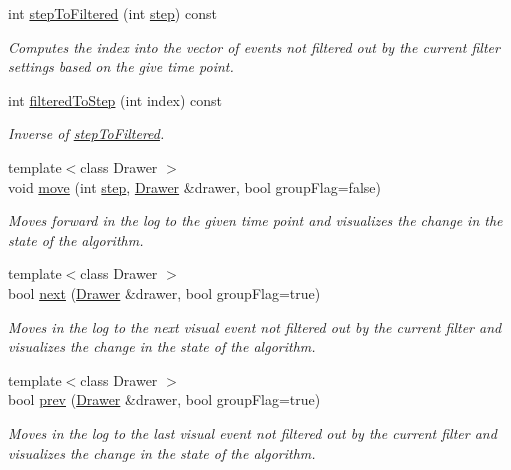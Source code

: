 \begin{DoxyCompactItemize}
int \hyperlink{structVisualLog_af2765ed0921d608071988ac0b0200b54}{step\+To\+Filtered} (int \hyperlink{structVisualLog_a7fb296e9d2f755787cd1a0e2e16a0e77}{step}) const 
\begin{DoxyCompactList}\small\item\em Computes the index into the vector of events not filtered out by the current filter settings based on the give time point. \end{DoxyCompactList}\item 
int \hyperlink{structVisualLog_a5e64209b901dc682a28a4b5ab8e4b4b8}{filtered\+To\+Step} (int index) const 
\begin{DoxyCompactList}\small\item\em Inverse of \hyperlink{structVisualLog_af2765ed0921d608071988ac0b0200b54}{step\+To\+Filtered}. \end{DoxyCompactList}\item 
{\footnotesize template$<$class Drawer $>$ }\\void \hyperlink{structVisualLog_a5eb5a2b8e8bbb43cb7c10a8414a475e6}{move} (int \hyperlink{structVisualLog_a7fb296e9d2f755787cd1a0e2e16a0e77}{step}, \hyperlink{structDrawer}{Drawer} \&drawer, bool group\+Flag=false)
\begin{DoxyCompactList}\small\item\em Moves forward in the log to the given time point and visualizes the change in the state of the algorithm. \end{DoxyCompactList}\item 
{\footnotesize template$<$class Drawer $>$ }\\bool \hyperlink{structVisualLog_abf41d29745df2d99f1bffbe4c13d74fc}{next} (\hyperlink{structDrawer}{Drawer} \&drawer, bool group\+Flag=true)
\begin{DoxyCompactList}\small\item\em Moves in the log to the next visual event not filtered out by the current filter and visualizes the change in the state of the algorithm. \end{DoxyCompactList}\item 
{\footnotesize template$<$class Drawer $>$ }\\bool \hyperlink{structVisualLog_a0aa831e50b827b51cd0a5c9a2ba8cb48}{prev} (\hyperlink{structDrawer}{Drawer} \&drawer, bool group\+Flag=true)
\begin{DoxyCompactList}\small\item\em Moves in the log to the last visual event not filtered out by the current filter and visualizes the change in the state of the algorithm. \end{DoxyCompactList}\item 

\end{DoxyCompactItemize}
